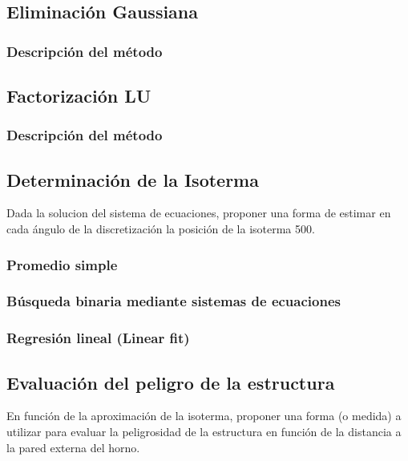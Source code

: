 \subsection{Eliminación Gaussiana}

\subsubsection{Descripción del método}

\subsection{Factorización LU}

\subsubsection{Descripción del método}

\subsection{Determinación de la Isoterma}

Dada la solucion del sistema de ecuaciones, proponer una forma de estimar en cada ángulo de la discretización la posición de la isoterma 500.

\subsubsection{Promedio simple}

\subsubsection{Búsqueda binaria mediante sistemas de ecuaciones}

\subsubsection{Regresión lineal (Linear fit)}


\subsection{Evaluación del peligro de la estructura}

En función de la aproximación de la isoterma, proponer una forma (o medida) a utilizar para evaluar la peligrosidad de la estructura en función de la distancia a la pared externa del horno.

